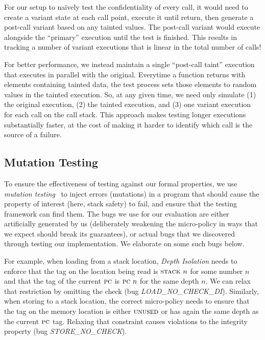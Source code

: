 \documentclass[10pt,conference]{ieeetran}%
\theoremstyle{definition}
\begin{document}
For our setup to na\"{i}vely test the confidentiality of every call,
it would need to create a variant state at each call point, execute
it until return, then generate a post-call variant based on any tainted
values. The post-call variant would execute alongside the ``primary''
execution until the test is finished. This results in tracking a number
of variant executions that is linear in the total number of calls!

For better performance, we instead maintain a single ``post-call taint''
execution that executes in parallel with the original. Everytime a function returns
with elements containing tainted data, the test process sets those elements
to random values in the tainted execution. So, at any given time, we need only simulate
(1) the original execution, (2) the tainted execution, and (3) one
variant execution for each call on the call stack. This approach
makes testing longer executions substantially faster, at the cost of making it
harder to identify which call is the source of a failure.

\subsection{Mutation Testing}

To ensure the effectiveness of testing against our formal properties, we
use {\em mutation testing}~\cite{JiaH11} to inject errors
(mutations) in a program that should cause the property of interest (here,
stack safety) to fail, and ensure that the testing framework can find
them. The bugs we use for our evaluation are either artificially generated
by us (deliberately weakening the micro-policy in ways that we expect
should break its guarantees), or actual bugs that we discovered through
testing our implementation. We elaborate on some such bugs below.

For example, when loading from a stack location, {\em Depth Isolation}
needs to enforce that the tag on the location being read
is $\textsc{stack} ~ n$ for some number $n$ and that the tag of the
current $\textsc{pc}$ is $\textsc{pc} ~ n$ for the same depth $n$. We can relax
that restriction by omitting the check (bug {\em
  LOAD\_NO\_CHECK\_DI}).
%
Similarly, when storing to a stack location, the correct micro-policy
needs to ensure that the tag on the memory location is either
$\textsc{unused}$ or has again the same depth as the current $\textsc{pc}$
tag. Relaxing that constraint causes violations to the integrity
property (bug {\em STORE\_NO\_CHECK}).
\end{document}
